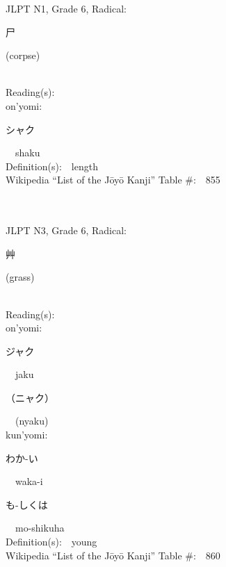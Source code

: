 \begin{multicols}{2}
{JLPT N1, Grade 6, Radical:\ \ {\begin{CJK}{UTF8}{min} 尸 \end{CJK}} (corpse) } \\
Reading(s):\ \ \\
{\hspace*{1em}}on'yomi:\ \ \\
{\hspace*{2em}}{\begin{CJK}{UTF8}{min} シャク \end{CJK}}\ \ shaku\ \ \\
Definition(s):\ \ length \\
Wikipedia ``List of the J\=oy\=o Kanji'' Table \#:\ \ 855 \\
\ \ \\
{\fontsize{34pt}{40pt}  }\ \ \\  %
{JLPT N3, Grade 6, Radical:\ \ {\begin{CJK}{UTF8}{min} 艸 \end{CJK}} (grass) } \\
Reading(s):\ \ \\
{\hspace*{1em}}on'yomi:\ \ \\
{\hspace*{2em}}{\begin{CJK}{UTF8}{min} ジャク \end{CJK}}\ \ jaku\ \ \\
{\hspace*{2em}}{\begin{CJK}{UTF8}{min} （ニャク） \end{CJK}}\ \ (nyaku)\ \ \\
{\hspace*{1em}}kun'yomi:\ \ \\
{\hspace*{2em}}{\begin{CJK}{UTF8}{min} わか-い \end{CJK}}\ \ waka-i\ \ \\
{\hspace*{2em}}{\begin{CJK}{UTF8}{min} も-しくは \end{CJK}}\ \ mo-shikuha\ \ \\
Definition(s):\ \ young \\
Wikipedia ``List of the J\=oy\=o Kanji'' Table \#:\ \ 860 \\

\end{multicols}

